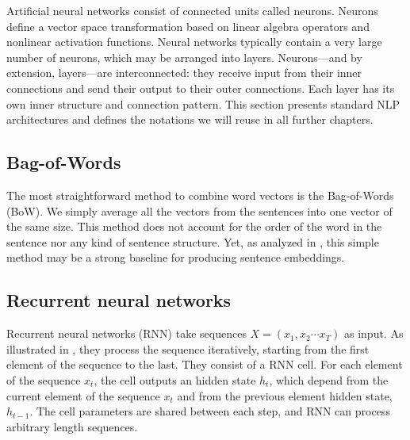 Artificial neural networks consist of connected units called neurons. Neurons define a vector space transformation based on linear algebra operators and nonlinear activation functions. Neural networks typically contain a very large number of neurons, which may be arranged into layers. Neurons—and by extension, layers—are interconnected: they receive input from their inner connections and send their output to their outer connections. Each layer has its own inner structure and connection pattern. This section presents standard NLP architectures and defines the notations we will reuse in all further chapters.




\subsection{Bag-of-Words}

The most straightforward method to combine word vectors is the Bag-of-Words (BoW). We simply average all the vectors from the sentences into one vector of the same size. This method does not account for the order of the word in the sentence nor any kind of sentence structure. Yet, as analyzed in \textcite{arora_17}, this simple method may be a strong baseline for producing sentence embeddings.

\subsection{Recurrent neural networks}

Recurrent neural networks (RNN) \parencite{hochreiter_97, cho_14} take sequences $X = (x_1, x_2 \cdots x_T)$ as input. As illustrated in , they process the sequence iteratively, starting from the first element of the sequence to the last. They consist of a RNN cell. For each element of the sequence $x_t$, the cell outputs an hidden state $h_t$, which depend from the current element of the sequence $x_t$ and from the previous element hidden state, $h_{t-1}$. The cell parameters are shared between each step, and RNN can process arbitrary length sequences.

